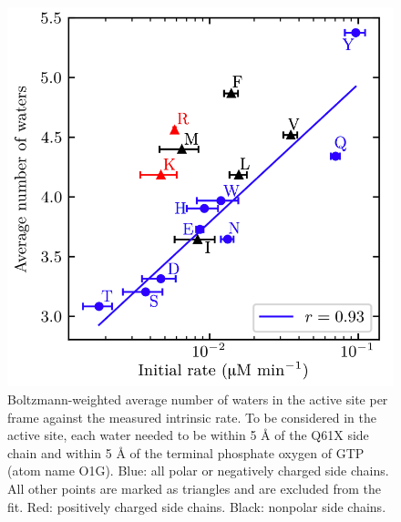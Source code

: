 \begin{figure}
    \center
    \includegraphics[width=\single]{figures-ras/Figure6.png}
    \caption[Number of waters in the active site against the measured intrinsic rate]{
        Boltzmann-weighted average number of waters in the active site per frame against the measured intrinsic rate. 
        To be considered in the active site, each water needed to be within 5 \si{\angstrom} of the Q61X side chain and within 5 \si{\angstrom} of the terminal phosphate oxygen of GTP (atom name O1G). 
        Blue: all polar or negatively charged side chains. 
        All other points are marked as triangles and are excluded from the fit. 
        Red: positively charged side chains. 
        Black: nonpolar side chains.
    }
    \label{fig:ras-scount}
\end{figure}

